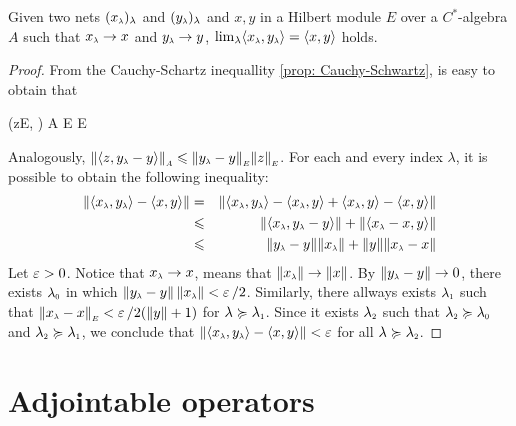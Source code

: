 \begin{lema}
\label{lema: lim <x_lambda,y_lambda> = <x,y>}
Given two nets $(\sub x\lambda)_\lambda$ and $(\sub y\lambda)_\lambda$ and $x,y$ in a Hilbert module $E$ over a $C^*$-algebra $A$ such that $\sub x\lambda \to x$ and $\sub y\lambda \to y$,  $\lim_\lambda \inner{\sub x\lambda}{\sub y\lambda} = \inner xy$ holds.
\begin{proof}
From the Cauchy-Schartz inequallity \ref{prop: Cauchy-Schwartz}, is easy to obtain that
\begin{eqspaced*}{(z\in E, \lambda \in \LLambda)}
    A \overset{(\ref{eq: cauchy-schwarts})}\leqslant {}E E
\end{eqspaced*}
Analogously, $\sub{\|\inner z{\sub y\lambda-y}\|}A \leqslant \sub{\|\sub y\lambda-y\|}E \sub{\|z\|}E$. For each and every index $\lambda$, it is possible to obtain the following inequality:
\begin{eqnarray*}
    \|\inner{\sub x\lambda}{\sub y\lambda} - \inner xy\| &=& \|\inner{\sub x\lambda}{\sub y\lambda} - \inner{\sub x\lambda}y + \inner{\sub x\lambda}y- \inner xy\|  \\
    &\leqslant& \|\inner{\sub x\lambda}{\sub y\lambda-y}\| + \| \inner{\sub x\lambda-x}y\| \\
    &\leqslant& \|\sub y\lambda-y\| \|\sub x\lambda\| +\|y\|\|\sub x\lambda-x\| 
\end{eqnarray*}
Let $\operatorname{{\varepsilon}} > 0$. Notice that $\sub x\lambda \to x$, means that $\|\sub x\lambda\| \to \|x\|$. By $\|\sub y\lambda -y\|\to 0$,  there exists $\sub\lambda 0$ in which $\|\sub y\lambda - y\|\,\|\sub x\lambda\|  < \ep/2 $. Similarly, there allways exists $\sub\lambda1$ such that $\sub{\|\sub x\lambda -x\|}E < \ep/2({\|y\|}+1)$ for $\lambda \succeq \sub\lambda1$. Since it exists $\sub\lambda2 $ such that $\sub\lambda2 \succeq \sub\lambda0$ and $\sub\lambda2 \succeq \sub\lambda1$, we conclude that $\|\inner{\sub x\lambda}{\sub y\lambda} - \inner xy\| < \ep$ for all $\lambda \succeq \sub\lambda2$.
\end{proof}
\end{lema}



\section{Adjointable operators}

